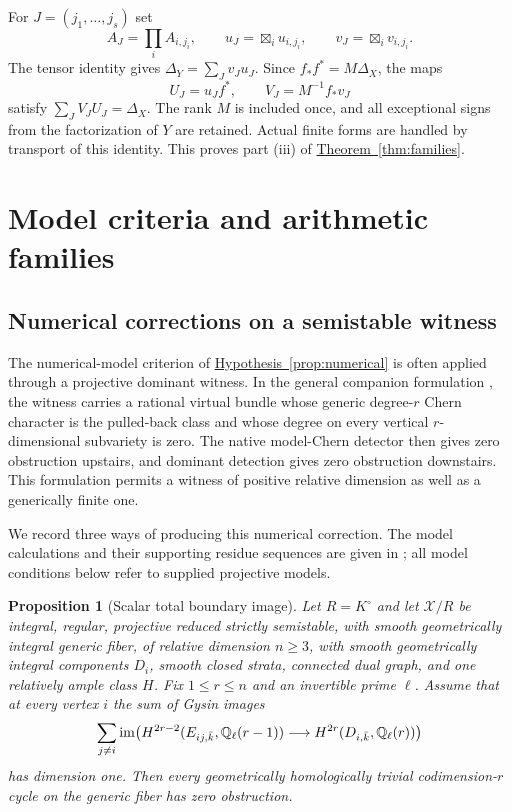 \documentclass[11pt,a4paper]{article}
\newtheorem{proposition}[theorem]{Proposition}
\theoremstyle{definition}
\theoremstyle{remark}\newtheorem{remark}[theorem]{Remark}
\numberwithin{equation}{section}
\newcommand{\Q}{\mathbb Q}\newcommand{\R}{\mathbb R}\newcommand{\C}{\mathbb C}
\newcommand{\thmref}[1]{\hyperref[#1]{\textcolor{resultlink}{Theorem~\ref*{#1}}}}
\newcommand{\hypref}[1]{\hyperref[#1]{\textcolor{resultlink}{Hypothesis~\ref*{#1}}}}
\begin{document}
For $J=(j_1,\ldots,j_s)$ set
\[
 A_J=\prod_i A_{i,j_i},\qquad
 u_J=\boxtimes_i u_{i,j_i},\qquad v_J=\boxtimes_i v_{i,j_i}.
\]
The tensor identity gives $\Delta_Y=\sum_Jv_Ju_J$.
Since $f_*f^*=M\Delta_X$, the maps
\begin{equation}\label{eq:cyclic-diagonal}
                   U_J=u_Jf^*,\qquad V_J=M^{-1}f_*v_J
\end{equation}
satisfy $\sum_JV_JU_J=\Delta_X$. The rank $M$ is included
once, and all exceptional signs from the factorization of $Y$
are retained. Actual finite forms are handled by transport of
this identity. This proves part (iii) of \thmref{thm:families}.


\section{Model criteria and arithmetic families}\label{sec:models}

\subsection{Numerical corrections on a semistable witness}

The numerical-model criterion of \hypref{prop:numerical} is often
applied through a projective dominant witness. In the general
companion formulation \cite{InternalEndpoints}, the witness carries
a rational virtual bundle whose generic degree-$r$ Chern character
is the pulled-back class and whose degree on every vertical
$r$-dimensional subvariety is zero. The native model-Chern detector
then gives zero obstruction upstairs, and dominant detection gives
zero obstruction downstairs. This formulation permits a witness
of positive relative dimension as well as a generically finite one.

We record three ways of producing this numerical correction.
The model calculations and their supporting residue sequences are
given in \cite{InternalModelCriteria}; all model conditions below
refer to supplied projective models.

\begin{proposition}[Scalar total boundary image]\label{prop:scalar-model}
Let $R=K^\circ$ and let $\mathcal X/R$ be integral, regular,
projective reduced strictly semistable, with smooth geometrically
integral generic fiber,
of relative dimension $n\geq3$, with smooth geometrically integral
components $D_i$, smooth closed strata, connected dual graph, and
one relatively ample class $H$. Fix $1\leq r\leq n$ and an
invertible prime $\ell$. Assume that at every vertex $i$ the sum
of Gysin images
\[
 \sum_{j\ne i}\im\bigl(
 H^{2r-2}(E_{ij,\bar k},\Q_\ell(r-1))
       \longrightarrow H^{2r}(D_{i,\bar k},\Q_\ell(r))\bigr)
\]
has dimension one. Then every geometrically homologically trivial
codimension-$r$ cycle on the generic fiber has zero obstruction.
\end{proposition}
\end{document}
